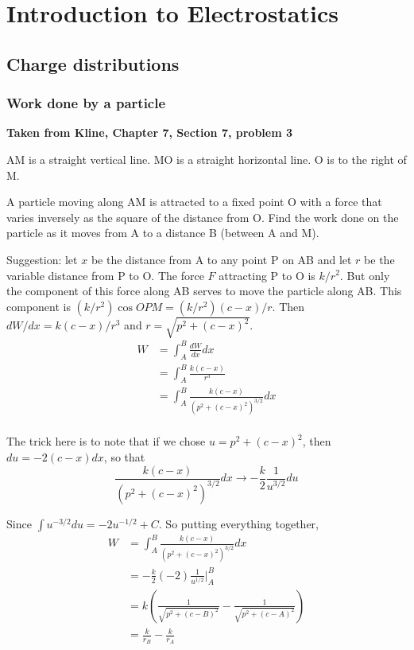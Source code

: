 \section{Introduction to Electrostatics}


\subsection{Charge distributions}

\subsubsection{Work done by a particle}

\textbf{Taken from Kline, Chapter 7, Section 7, problem 3}

AM is a straight vertical line.
MO is a straight horizontal line. O is to the right of M.

A particle moving along AM is attracted to a fixed point O with a force that varies inversely
as the square of the distance from O.
Find the work done on the particle as it moves from A to a distance B (between A and M).

Suggestion: let $x$ be the distance from A to any point P on AB
and let $r$ be the variable distance from P to O.
The force $F$ attracting P to O is $k/r^2$.
But only the component of this force along AB serves to move the particle along AB.
This component is $(k/r^2) \cos OPM = (k/r^2) (c-x)/r$.
Then $dW/dx = k (c-x)/r^3$ and $r = \sqrt{p^2 + (c-x)^2}$.
\\

\begin{align*}
W &= \int_{A}^{B} \frac{dW}{dx} dx \\
&= \int_{A}^{B} \frac{k (c-x)}{r^3} \\
&= \int_{A}^{B} \frac{k (c-x)}{\left(p^2 + (c-x)^2\right)^{3/2}} dx \\
\end{align*}

The trick here is to note that if we chose $u = p^2 + (c-x)^2$, then $du = -2(c-x) dx$, so that
$$
\frac{k (c-x)}{\left(p^2 + (c-x)^2\right)^{3/2}} dx \rightarrow -\frac{k}{2}\frac{1}{u^{3/2}} du
$$

Since $\int u^{-3/2} du = -2 u^{-1/2} + C$.
So putting everything together,
\begin{align*}
W &= \int_{A}^{B} \frac{k (c-x)}{\left(p^2 + (c-x)^2\right)^{3/2}} dx \\
&= -\frac{k}{2} (-2) \frac{1}{u^{1/2}} \Big|_{A}^{B} \\
&= k \left( \frac{1}{\sqrt{p^2 + (c-B)^2}} - \frac{1}{\sqrt{p^2 + (c-A)^2}} \right) \\
&= \frac{k}{r_B} - \frac{k}{r_A}
\end{align*}

